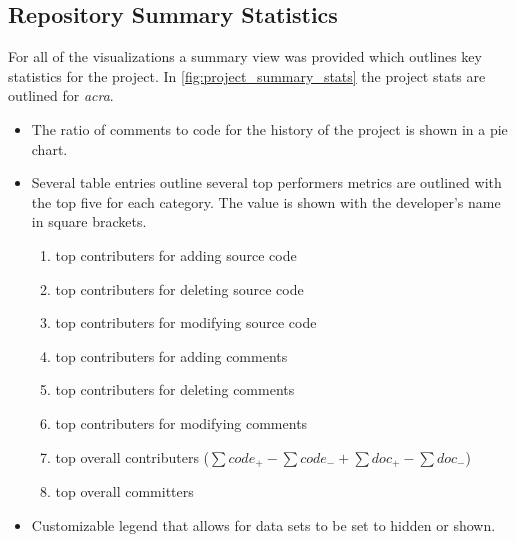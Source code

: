 
\subsection{Repository Summary Statistics}

For all of the visualizations a summary view was provided which outlines key statistics for the project. In \autoref{fig:project_summary_stats} the project stats are outlined for \textit{acra}. 
\begin{itemize}
\item The ratio of comments to code for the history of the project is shown in a pie chart.
\item Several table entries outline several top performers metrics are outlined with the top five for each category. The value is shown with the developer's name in square brackets.
    \begin{enumerate}
    \item top contributers for adding source code
    \item top contributers for deleting source code
    \item top contributers for modifying source code
    \item top contributers for adding comments
    \item top contributers for deleting comments
    \item top contributers for modifying comments
    \item top overall contributers ($\sum code_{+} - \sum code_{-} + \sum doc_{+} - \sum doc_{-}$)
    \item top overall committers
    \end{enumerate}
\item Customizable legend that allows for data sets to be set to hidden or shown.
\end{itemize}

